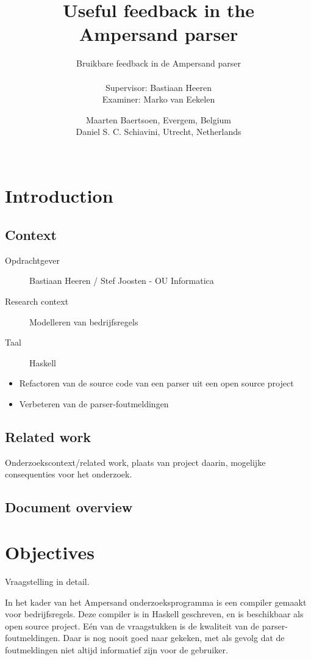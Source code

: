 \documentclass[a4paper,12pt,abstracton,titlepage]{scrartcl}
\author{Maarten Baertsoen, Evergem, Belgium \\
	Daniel S. C. Schiavini, Utrecht, Netherlands\\~}
\affil{Open Universiteit Nederland, faculteit Informatica\\
	T61327 - Afstudeerproject bachelor informatica}
\title{Useful feedback in the\\ Ampersand parser}
\subtitle{Bruikbare feedback in de Ampersand parser \\
	~\\
	Supervisor: Bastiaan Heeren\\
	Examiner: Marko van Eekelen}
\begin{document}
\maketitle
\newpage

\tableofcontents
\clearpage

\section{Introduction}
\subsection{Context}
\begin{description}
\item [Opdrachtgever] Bastiaan Heeren / Stef Joosten - OU Informatica
\item [Research context] Modelleren van bedrijfsregels
\item [Taal] Haskell
\end{description}

\begin{itemize}
\item Refactoren van de source code van een parser uit een open source project 
\item Verbeteren van de parser-foutmeldingen
\end{itemize}

\subsection{Related work}
Onderzoekscontext/related work, plaats van project daarin, mogelijke consequenties voor het onderzoek.

\subsection{Document overview}
\lipsum[1]

\newpage
\section{Objectives}
Vraagstelling in detail.

In het kader van het Ampersand onderzoeksprogramma is een compiler gemaakt voor bedrijfsregels. Deze compiler is in Haskell geschreven, en is beschikbaar als open source project. Eén van de vraagstukken is de kwaliteit van de parser-foutmeldingen. Daar is nog nooit goed naar gekeken, met als gevolg dat de foutmeldingen niet altijd informatief zijn voor de gebruiker.
\end{document}

